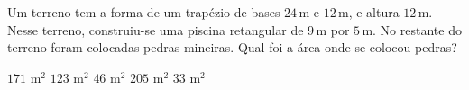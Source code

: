\noindent\parbox{\linewidth}{

Um terreno tem a forma de um trapézio de bases $24$\,m e $12$\,m, e altura $12$\,m. Nesse terreno, construiu-se uma piscina retangular de $9$\,m por $5$\,m. No restante do terreno foram colocadas pedras mineiras. Qual foi a área onde se colocou pedras?

$171$ m$^2$
$123$ m$^2$
$46$ m$^2$
$205$ m$^2$
$33$ m$^2$



}


